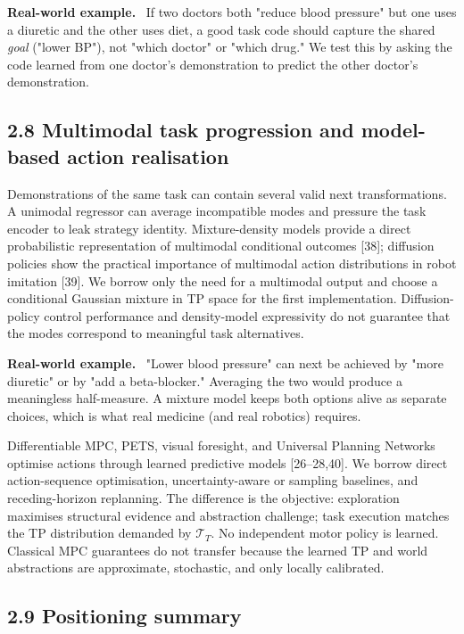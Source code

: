 \documentclass[11pt]{article}
\newenvironment{example}{%
  \par\smallskip\noindent\begin{minipage}{\textwidth}%
  \color{teal!60!black}\small
  \textbf{\color{teal!70!black}Real-world example.}\
}{%
  \end{minipage}\par\smallskip}
\begin{document}
\begin{example}
If two doctors both "reduce blood pressure" but one uses a diuretic and the other uses diet, a good task code should capture the
shared \emph{goal} ("lower BP"), not "which doctor" or "which drug." We test this by asking the code learned from one doctor's
demonstration to predict the other doctor's demonstration.
\end{example}

\subsection*{2.8 Multimodal task progression and model-based action realisation}

Demonstrations of the same task can contain several valid next transformations. A unimodal regressor can average incompatible modes
and pressure the task encoder to leak strategy identity. Mixture-density models provide a direct probabilistic representation of
multimodal conditional outcomes [38]; diffusion policies show the practical importance of multimodal action distributions in robot
imitation [39]. We borrow only the need for a multimodal output and choose a conditional Gaussian mixture in TP space for the first
implementation. Diffusion-policy control performance and density-model expressivity do not guarantee that the modes correspond to
meaningful task alternatives.

\begin{example}
"Lower blood pressure" can next be achieved by "more diuretic" or by "add a beta-blocker." Averaging the two would produce a
meaningless half-measure. A mixture model keeps both options alive as separate choices, which is what real medicine (and real
robotics) requires.
\end{example}

Differentiable MPC, PETS, visual foresight, and Universal Planning Networks optimise actions through learned predictive models
[26--28,40]. We borrow direct action-sequence optimisation, uncertainty-aware or sampling baselines, and receding-horizon
replanning. The difference is the objective: exploration maximises structural evidence and abstraction challenge; task execution
matches the TP distribution demanded by $\mathcal T_T$. No independent motor policy is learned. Classical MPC guarantees do not
transfer because the learned TP and world abstractions are approximate, stochastic, and only locally calibrated.

\subsection*{2.9 Positioning summary}
\end{document}
